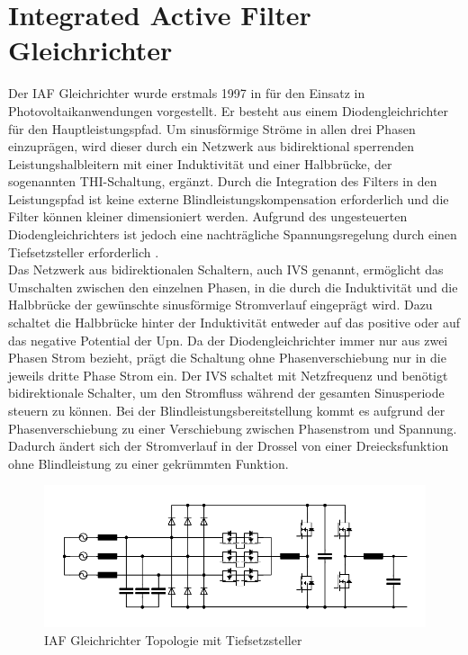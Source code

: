 \section{Integrated Active Filter Gleichrichter}
	Der \gls{IAF} Gleichrichter wurde erstmals 1997 in \cite{IAFfirst} für den Einsatz in Photovoltaikanwendungen vorgestellt. Er besteht aus einem Diodengleichrichter für den Hauptleistungspfad. Um sinusförmige Ströme in allen drei Phasen einzuprägen, wird dieser durch ein Netzwerk aus bidirektional sperrenden Leistungshalbleitern mit einer Induktivität und einer Halbbrücke, der sogenannten \gls{THI}-Schaltung, ergänzt. Durch die Integration des Filters in den Leistungspfad ist keine externe Blindleistungskompensation erforderlich und die Filter können kleiner dimensioniert werden. Aufgrund des ungesteuerten Diodengleichrichters ist jedoch eine nachträgliche Spannungsregelung durch einen Tiefsetzsteller erforderlich \cite{ThesisSchrittwieserBuckTypePFC_2017}.\\
	Das Netzwerk aus bidirektionalen Schaltern, auch \gls{IVS} genannt, ermöglicht das Umschalten zwischen den einzelnen Phasen, in die durch die Induktivität und die Halbbrücke der gewünschte sinusförmige Stromverlauf eingeprägt wird. Dazu schaltet die Halbbrücke hinter der Induktivität entweder auf das positive oder auf das negative Potential der \gls{Upn}. Da der Diodengleichrichter immer nur aus zwei Phasen Strom bezieht, prägt die Schaltung ohne Phasenverschiebung nur in die jeweils dritte Phase Strom ein. Der \gls{IVS} schaltet mit Netzfrequenz und benötigt bidirektionale Schalter, um den Stromfluss während der gesamten Sinusperiode steuern zu können. Bei der Blindleistungsbereitstellung kommt es aufgrund der Phasenverschiebung zu einer Verschiebung zwischen Phasenstrom und Spannung. Dadurch ändert sich der Stromverlauf in der Drossel von einer Dreiecksfunktion ohne Blindleistung zu einer gekrümmten Funktion.
	\begin{figure}
		\centering
		\includegraphics[width=0.9\linewidth]{content/Grafiken/IAF}
		\caption{\gls{IAF} Gleichrichter Topologie mit Tiefsetzsteller}
		\label{fig:iaf}
	\end{figure}


